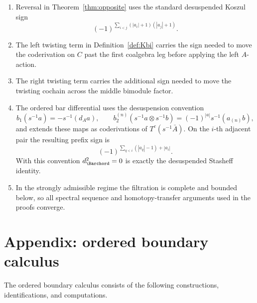 \begin{enumerate}[label=(\arabic*)]
\item Reversal in Theorem~\ref{thm:opposite} uses the standard desuspended Koszul sign
\[
(-1)^{\sum_{i<j}(|a_i|+1)(|a_j|+1)}.
\]

\item The left twisting term in Definition~\ref{def:Kbi} carries the sign needed to move the
coderivation on $C$ past the first coalgebra leg before applying the left $A$-action.

\item The right twisting term carries the additional sign needed to move the twisting cochain across
the middle bimodule factor.

\item The ordered bar differential uses the desuspension convention
\[
b_1(s^{-1}a)=-s^{-1}(d_Aa),\qquad
b_2^{(n)}(s^{-1}a\otimes s^{-1}b)
=(-1)^{|a|}s^{-1}(a_{(n)}b),
\]
and extends these maps as coderivations of $T^c(s^{-1}\bar A)$.
On the $i$-th adjacent pair the resulting prefix sign is
\[
(-1)^{\sum_{q<i}(|a_q|-1)+|a_i|}.
\]
With this convention \(d_{\Barchord}^2=0\) is exactly the desuspended
Stasheff identity.

\item In the strongly admissible regime the filtration is complete and bounded below, so all spectral
sequence and homotopy-transfer arguments used in the proofs converge.
\end{enumerate}


\section{Appendix: ordered boundary calculus}

The ordered boundary calculus consists of the following constructions,
identifications, and computations.

